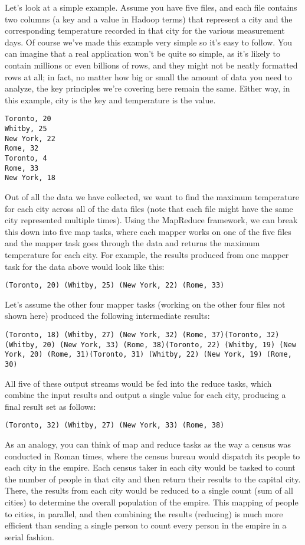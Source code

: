 \documentclass[12pt]{article}
\begin{document}
Let’s look at a simple example. Assume you have five files, and each file contains two columns (a key and a value in Hadoop terms) that represent a city and the corresponding temperature recorded in that city for the various measurement days. Of course we’ve made this example very simple so it’s easy to follow. You can imagine that a real application won’t be quite so simple, as it’s likely to contain millions or even billions of rows, and they might not be neatly formatted rows at all; in fact, no matter how big or small the amount of data you need to analyze, the key principles we’re covering here remain the same. Either way, in this example, city is the key and tempera­ture is the value.
\begin{verbatim}
Toronto, 20 
Whitby, 25 
New York, 22 
Rome, 32 
Toronto, 4 
Rome, 33 
New York, 18
\end{verbatim}


Out of all the data we have collected, we want to find the maximum tem­perature for each city across all of the data files (note that each file might have the same city represented multiple times). Using the MapReduce framework, we can break this down into five map tasks, where each mapper works on one of the five files and the mapper task goes through the data and returns the maximum temperature for each city. For example, the results produced from one mapper task for the data above would look like this:
\begin{verbatim}
(Toronto, 20) (Whitby, 25) (New York, 22) (Rome, 33)
\end{verbatim}

Let’s assume the other four mapper tasks (working on the other four files not shown here) produced the following intermediate results:
\begin{verbatim}
(Toronto, 18) (Whitby, 27) (New York, 32) (Rome, 37)(Toronto, 32) (Whitby, 20) (New York, 33) (Rome, 38)(Toronto, 22) (Whitby, 19) (New York, 20) (Rome, 31)(Toronto, 31) (Whitby, 22) (New York, 19) (Rome, 30)
\end{verbatim}
All five of these output streams would be fed into the reduce tasks, which combine the input results and output a single value for each city, producing a final result set as follows:
\begin{verbatim}
(Toronto, 32) (Whitby, 27) (New York, 33) (Rome, 38)
\end{verbatim}
As an analogy, you can think of map and reduce tasks as the way a cen­sus was conducted in Roman times, where the census bureau would dis­patch its people to each city in the empire. Each census taker in each city would be tasked to count the number of people in that city and then return their results to the capital city. There, the results from each city would be reduced to a single count (sum of all cities) to determine the overall popula­tion of the empire. This mapping of people to cities, in parallel, and then com­bining the results (reducing) is much more efficient than sending a single per­son to count every person in the empire in a serial fashion.
\end{document}
